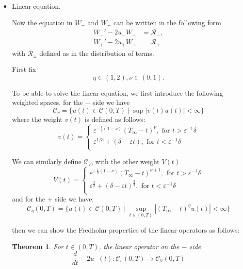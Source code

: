 \documentclass[letterpaper,11pt]{article}
\newcommand{\eps}{\varepsilon}
\numberwithin{equation}{section}
\theoremstyle{plain}
\newtheorem{theorem}{Theorem}[section]
\begin{document}
\begin{enumerate}
\begin{itemize}

\pagebreak
\item Linear equation.

Now the equation in $W_-$ and $W_+$ can be written in the following form
\begin{align*}
W_-' - 2u_- W_- &= \mathcal{R}_- ,\\
W_+' - 2u_+ W_+ &= \mathcal{R}_+
\end{align*}
with $\mathcal{R}_{\pm}$ defined as in the distribution of terms.

First fix
\[
\eta \in (1,2), \nu \in (0,1).
\]

To be able to solve the linear equation, we first introduce the following weighted spaces, for the $-$ side we have
\[
\mathcal{C}_v = \{u(t) \in \mathcal{C}(0,T) \mid \sup |v(t) u(t)| < \infty\}
\]
where the weight $v(t)$ is defined as follows:
\[
v(t)=
\begin{cases}
\eps^{-\frac{1}{3}(1-\nu)} (T_\infty-t)^\nu, \text{ for }t> \eps^{-1}\delta\\
\eps^{1/3}+(\delta-\eps t), \text{ for }t < \eps^{-1}\delta\\
\end{cases}
\]

We can similarly define $\mathcal{C}_V$, with the other weight $V(t)$ 
\[
V(t)=
\begin{cases}
\eps^{-\frac{1}{3}(1-\nu)} (T_\infty-t)^{\nu+1}, \text{ for }t> \eps^{-1}\delta\\
\eps^{\frac{2}{3}}+(\delta - \eps t)^{\frac{3}{2}}, \text{ for }t < \eps^{-1}\delta\\
\end{cases}
\]
and for the $+$ side we have:
\[
\mathcal{C}_\eta(0,T) = \{ u(t) \in \mathcal{C}(0,T) \mid \sup_{t\in (0,T)}|(T_\infty - t)^{\eta} u(t)| < \infty  \}
\]



then we can show the Fredholm properties of the linear operators as follows: 
\begin{theorem}
For $t \in (0,T)$, the linear operator on the $-$ side
\[
\frac{d}{dt} - 2u_-(t) : \mathcal{C}_v (0,T) \to \mathcal{C}_V (0,T)
\]


\end{theorem}
\end{itemize}
\end{enumerate}
\end{document}

